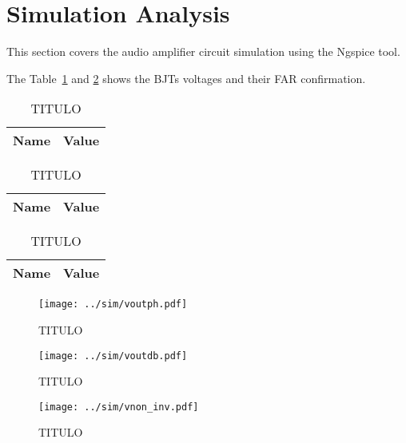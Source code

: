 \section{Simulation Analysis}
\label{sec:simulation}

\hspace{0,5cm} This section covers the audio amplifier circuit simulation using the Ngspice tool.


\par The Table~\ref{tab:ng2} and \ref{tab:ng3} shows the BJTs voltages and their FAR confirmation.

\begin{table}[!ht]
  \centering
  \begin{tabular}{|l|r|}
    \hline    
    {\bf Name} & {\bf Value } \\ \hline
    
  \end{tabular}
  \caption{TITULO}
  \label{tab:ng2}
\end{table}

\begin{table}[!ht]
  \centering
  \begin{tabular}{|l|r|}
    \hline    
    {\bf Name} & {\bf Value } \\ \hline
    
  \end{tabular}
  \caption{TITULO}
  \label{tab:ng3}
\end{table}


\begin{table}[!ht]
  \centering
  \begin{tabular}{|l|r|}
    \hline    
    {\bf Name} & {\bf Value } \\ \hline
    
  \end{tabular}
  \caption{TITULO}
  \label{tab:ng4}
\end{table}





\begin{figure}[H] \centering
\texttt{[image: ../sim/voutph.pdf]}
\caption{TITULO}
\label{fig:ng1}
\end{figure}

\begin{figure}[H] \centering
\texttt{[image: ../sim/voutdb.pdf]}
\caption{TITULO}
\label{fig:ng6}
\end{figure}

\begin{figure}[H] \centering
\texttt{[image: ../sim/vnon\_inv.pdf]}
\caption{TITULO}
\label{fig:ng7}
\end{figure}

